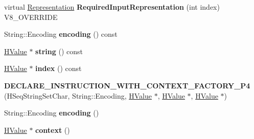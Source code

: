 \begin{DoxyCompactItemize}
\item 
\hypertarget{classv8_1_1internal_1_1_v8___f_i_n_a_l_a6c6d1f37f40b113d8f4062f1ffff7215}{}virtual \hyperlink{classv8_1_1internal_1_1_representation}{Representation} {\bfseries Required\+Input\+Representation} (int index) V8\+\_\+\+O\+V\+E\+R\+R\+I\+D\+E\label{classv8_1_1internal_1_1_v8___f_i_n_a_l_a6c6d1f37f40b113d8f4062f1ffff7215}

\item 
\hypertarget{classv8_1_1internal_1_1_v8___f_i_n_a_l_a2c5a13d138f240728f9484ad316a3071}{}String\+::\+Encoding {\bfseries encoding} () const \label{classv8_1_1internal_1_1_v8___f_i_n_a_l_a2c5a13d138f240728f9484ad316a3071}

\item 
\hypertarget{classv8_1_1internal_1_1_v8___f_i_n_a_l_ac051ac05697d5f2da3e4a43f64a6b951}{}\hyperlink{classv8_1_1internal_1_1_h_value}{H\+Value} $\ast$ {\bfseries string} () const \label{classv8_1_1internal_1_1_v8___f_i_n_a_l_ac051ac05697d5f2da3e4a43f64a6b951}

\item 
\hypertarget{classv8_1_1internal_1_1_v8___f_i_n_a_l_ae35cd4b0e5fed0e15fcbbaaad81399c5}{}\hyperlink{classv8_1_1internal_1_1_h_value}{H\+Value} $\ast$ {\bfseries index} () const \label{classv8_1_1internal_1_1_v8___f_i_n_a_l_ae35cd4b0e5fed0e15fcbbaaad81399c5}

\item 
\hypertarget{classv8_1_1internal_1_1_v8___f_i_n_a_l_aa22b1940685b4c7979a17f0886afa566}{}{\bfseries D\+E\+C\+L\+A\+R\+E\+\_\+\+I\+N\+S\+T\+R\+U\+C\+T\+I\+O\+N\+\_\+\+W\+I\+T\+H\+\_\+\+C\+O\+N\+T\+E\+X\+T\+\_\+\+F\+A\+C\+T\+O\+R\+Y\+\_\+\+P4} (H\+Seq\+String\+Set\+Char, String\+::\+Encoding, \hyperlink{classv8_1_1internal_1_1_h_value}{H\+Value} $\ast$, \hyperlink{classv8_1_1internal_1_1_h_value}{H\+Value} $\ast$, \hyperlink{classv8_1_1internal_1_1_h_value}{H\+Value} $\ast$)\label{classv8_1_1internal_1_1_v8___f_i_n_a_l_aa22b1940685b4c7979a17f0886afa566}

\item 
\hypertarget{classv8_1_1internal_1_1_v8___f_i_n_a_l_adaca3dfada2da0a6f232d3e2178063db}{}String\+::\+Encoding {\bfseries encoding} ()\label{classv8_1_1internal_1_1_v8___f_i_n_a_l_adaca3dfada2da0a6f232d3e2178063db}

\item 
\hypertarget{classv8_1_1internal_1_1_v8___f_i_n_a_l_a911a04b75b22f133c5eb5eafcc2d5f87}{}\hyperlink{classv8_1_1internal_1_1_h_value}{H\+Value} $\ast$ {\bfseries context} ()\label{classv8_1_1internal_1_1_v8___f_i_n_a_l_a911a04b75b22f133c5eb5eafcc2d5f87}


\end{DoxyCompactItemize}
